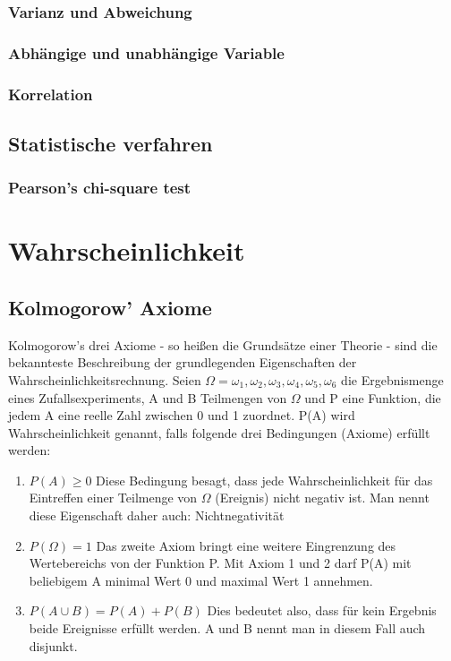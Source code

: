 \documentclass[letterpaper, titlepage]{article}
\begin{document}
\subsubsection{Varianz und Abweichung}\label{Varianz und Abweichung}

\subsubsection{Abhängige und unabhängige Variable}\label{Abhängige und unabhängige Variable}

\subsubsection{Korrelation}\label{Korrelation}

\subsection{Statistische verfahren}\label{Statistische verfahren}

\subsubsection{Pearson's chi-square test}\label{Pearson's chi-square test}


\section{Wahrscheinlichkeit}\label{Wahrscheinlichkeit}


\subsection{Kolmogorow' Axiome}\label{Kolmogorow's Axiome}
Kolmogorow's drei Axiome - so heißen die Grundsätze einer Theorie - sind die bekannteste Beschreibung der grundlegenden Eigenschaften der Wahrscheinlichkeitsrechnung. Seien $\Omega={\omega_1, \omega_2, \omega_3, \omega_4, \omega_5, \omega_6}$ die Ergebnismenge eines Zufallsexperiments, A und B Teilmengen von $\Omega$ und P eine Funktion, die jedem A eine reelle Zahl zwischen 0 und 1 zuordnet. P(A) wird Wahrscheinlichkeit genannt, falls folgende drei Bedingungen (Axiome) erfüllt werden:
\begin{enumerate}
    \item $P(A)\geq0$ Diese Bedingung besagt, dass jede Wahrscheinlichkeit für das Eintreffen einer Teilmenge von $\Omega$ (Ereignis) nicht negativ ist. Man nennt diese Eigenschaft daher auch: Nichtnegativität
    \item $P(\Omega)=1$ Das zweite Axiom bringt eine weitere Eingrenzung des Wertebereichs von der Funktion P. Mit Axiom 1 und 2 darf P(A) mit beliebigem A minimal Wert 0 und maximal Wert 1 annehmen.
    \item $P(A \cup B)=P(A)+P(B)$ Dies bedeutet also, dass für kein Ergebnis beide Ereignisse erfüllt werden. A und B nennt man in diesem Fall auch disjunkt.
\end{enumerate}
\end{document}
